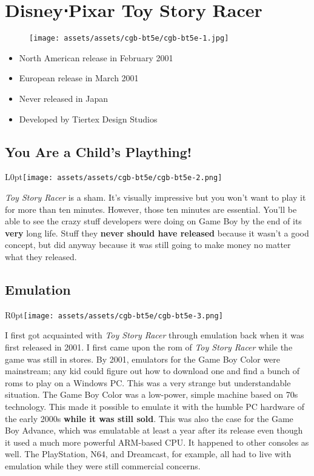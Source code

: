 \documentclass{book}
\begin{document}
\chapter*{Disney⋅Pixar Toy Story Racer}
\vspace{\baselineskip}\begin{figure}[H]{\texttt{[image: assets/assets/cgb-bt5e/cgb-bt5e-1.jpg]}}\end{figure}\vspace{\baselineskip}
\begin{itemize}[left=0pt, nosep]
\item North American release in February 2001
\item European release in March 2001
\item Never released in Japan
\item Developed by Tiertex Design Studios

\end{itemize}
\newpage\FloatBarrier\section*{You Are a Child’s Plaything!}
\begin{wrapfigure}{L}{0pt}{\texttt{[image: assets/assets/cgb-bt5e/cgb-bt5e-2.png]}}\end{wrapfigure}\noindent
\emph{Toy Story Racer} is a sham. It’s visually impressive but you won’t want to play it for more than ten minutes. However, those ten minutes are essential. You’ll be able to see the crazy stuff developers were doing on Game Boy by the end of its \textbf{very} long life. Stuff they \textbf{never should have released} because it wasn’t a good concept, but did anyway because it was still going to make money no matter what they released.\par
\FloatBarrier\section*{Emulation}
\begin{wrapfigure}{R}{0pt}{\texttt{[image: assets/assets/cgb-bt5e/cgb-bt5e-3.png]}}\end{wrapfigure}
I first got acquainted with \emph{Toy Story Racer} through emulation back when it was first released in 2001. I first came upon the rom of \emph{Toy Story Racer} while the game was still in stores. By 2001, emulators for the Game Boy Color were mainstream; any kid could figure out how to download one and find a bunch of roms to play on a Windows PC. This was a very strange but understandable situation. The Game Boy Color was a low-power, simple machine based on 70s technology. This made it possible to emulate it with the humble PC hardware of the early 2000s \textbf{while it was still sold}. This was also the case for the Game Boy Advance, which was emulatable at least a year after its release even though it used a much more powerful ARM-based CPU. It happened to other consoles as well. The PlayStation, N64, and Dreamcast, for example, all had to live with emulation while they were still commercial concerns.\par
\end{document}
